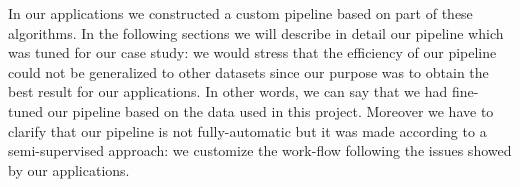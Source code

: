 \documentclass{standalone}
\begin{document}
In our applications we constructed a custom pipeline based on part of these algorithms.
In the following sections we will describe in detail our pipeline which was tuned for our case study: we would stress that the efficiency of our pipeline could not be generalized to other datasets since our purpose was to obtain the best result for our applications.
In other words, we can say that we had fine-tuned our pipeline based on the data used in this project.
Moreover we have to clarify that our pipeline is not fully-automatic but it was made according to a semi-supervised approach: we customize the work-flow following the issues showed by our applications.
\end{document}
